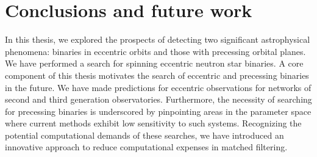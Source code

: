 \chapter{Conclusions and future work}

In this thesis, we explored the prospects of detecting two significant astrophysical phenomena: binaries in eccentric orbits and those with precessing orbital planes. We have performed a search for spinning eccentric neutron star binaries. A core component of this thesis motivates the search of eccentric and precessing binaries in the future. We have made predictions for eccentric observations for networks of second and third generation observatories. Furthermore, the necessity of searching for precessing binaries is underscored by pinpointing areas in the parameter space where current methods exhibit low sensitivity to such systems. Recognizing the potential computational demands of these searches, we have introduced an innovative approach to reduce computational expenses in matched filtering.



